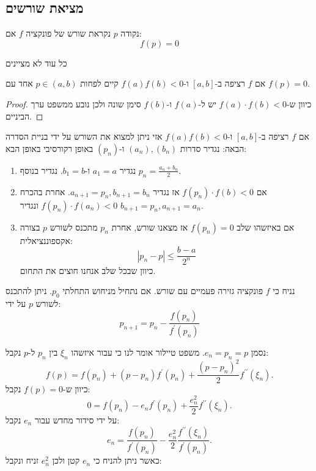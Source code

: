 \documentclass{tstextbook}
\begin{document}
\subsection{מציאת שורשים}

\begin{definition}
נקודה \(p\) נקראת שורש של פונקציה \(f\) אם:
$$f(p)=0$$

\end{definition}
\begin{remark}
כל עוד לא מציינים

\end{remark}
\begin{lemma}
אם \(f\) רציפה ב-\([a,b]\) ו-\(f(a)f(b)< 0\) קיים לפחות \(p \in (a,b)\) אחד עם \(f(p)=0\).

\end{lemma}
\begin{proof}
כיוון ש-\(f(a)\cdot f(b)< 0\) יש ל-\(f(a)\) ו-\(f(b)\) סימן שונה ולכן נובע ממשפט ערך הביניים. 

\end{proof}
\begin{proposition}
אם \(f\) רציפה ב-\([a,b]\) ו-\(f(a)f(b)< 0\) אזי ניתן למצוא את השורש על ידי בניית הסדרה הבאה:
נגדיר סדרות \((a_{n}),(b_{n})\) ו-\((p_{n})\) באופן רקורסיבי באופן הבא:

  \begin{enumerate}
    \item נגדיר \(a_{1}=a\) ו-\(b_{1}=b\). נגדיר בנוסף \(p_{n}=\frac{a_{n}+b_{n}}{2}\). 


    \item אם \(f(p_{n})\cdot f(b)< 0\) אז נגדיר \(a_{n+1}=p_{n},b_{n+1}=b_{n}\). אחרת בהכרח \(f(p_{n})\cdot f(a_{n})< 0\) ונגדיר \(b_{n+1}=p_{n},a_{n+1}=a_{n}\). 


    \item אם באיזשהו שלב \(f(p_{n})=0\) אז מצאנו שורש, אחרת \(p_{n}\) מתכנס לשורש \(p\) בצורה אקספוננציאלית: 
$$|p_{n}-p|\leq{\frac{b-a}{2^{n}}}$$
כיוון שבכל שלב אנחנו חוצים את התחום.


  \end{enumerate}
\end{proposition}
\begin{proposition}
נניח כי \(f\) פונקציה גזירה פעמיים עם שורש. אם נתחיל מניחוש התחלתי \(p_{0}\). ניתן להתכנס לשורש \(p\) על ידי:
$$p_{n+1}=p_{n}-{\frac{f(p_{n})}{f^{\prime}(p_{n})}}$$

\end{proposition}
נסמן \(e_{n}=p_{n}=p\). משפט טיילור אומר לנו כי עבור איזשהו \(\xi_{n}\) בין \(p_{n}\) ל-\(p\) נקבל:
$$f(p)=f(p_{n})+(p-p_{n})f^{\prime}(p_{n})+{\frac{(p-p_{n})^{2}}{2}}f^{\prime\prime}(\xi_{n}).$$
כיוון ש-\(f(p)=0\) נקבל:
$$0=f(p_{n})-e_{n}f^{\prime}(p_{n})+\frac{e_{n}^{2}}{2}f^{\prime\prime}(\xi_{n}).$$
על ידי סידור מחדש עבור \(e_{n}\) נקבל:
$$e_{n}=\frac{f(p_{n})}{f^{\prime}(p_{n})}-\frac{e_{n}^{2}}{2}\frac{f^{\prime\prime}(\xi_{n})}{f^{\prime}(p_{n})}.$$
כאשר ניתן להניח כי \(e_{n}\) קטן ולכן \(e_{n}^{2}\) זניח ונקבל:
\end{document}
